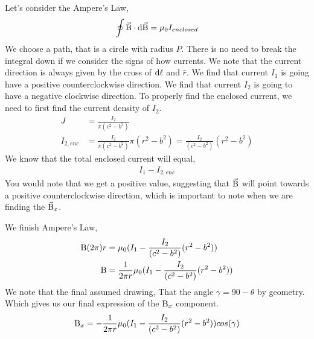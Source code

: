 \vspace{10pt}
Let's consider the Ampere's Law,
\begin{equation*}
	\oint \vec{\mathrm{B}} \cdot \mathrm{d}\vec{\mathrm{\mathrm{B}}} = \mu_0I_{enclosed}
\end{equation*}
We choose a path, that is a circle with radius $P$. There is no need to break the integral down if we consider the signs of how currents. We note that the current direction is always given by the cross of $\mathrm{d\ell}$ and $\hat{r}$. We find that current $I_1$ is going have a positive counterclockwise direction. We find that current $I_2$ is going to have a negative clockwise direction. To properly find the enclosed current, we need to first find the current density of $I_2$.
\begin{align*}
	J &= \frac{I_2}{\pi(c^2-b^2)} \\ 
	I_{2,enc} &= \frac{I_2}{\pi(c^2-b^2)} \pi (r^2-b^2) = \frac{I_2}{(c^2-b^2)}(r^2-b^2)
\end{align*}
We know that the total enclosed current will equal, 
\begin{align*}
	I_1 - I_{2,enc} 
\end{align*}
You would note that we get a positive value, suggesting that $\vec{\mathrm{B}}$ will point towards a positive counterclockwise direction, which is important to note when we are finding the $\vec{\mathrm{B}}_x$.

We finish Ampere's Law, 
\begin{align*}
	\mathrm{B}(2\pi)r &= \mu_0(I_1 - \frac{I_2}{(c^2-b^2)}(r^2-b^2)) \\ 
	\mathrm{B} &= \frac{1}{2\pi r}\mu_0(I_1 - \frac{I_2}{(c^2-b^2)}(r^2-b^2))
\end{align*}
We note that the final assumed drawing, 
That the angle $\gamma = 90 - \theta$ by geometry. Which gives us our final expression of the $\mathrm{B}_x$ component. 
\begin{equation*}
	\mathrm{B}_x = -\frac{1}{2\pi r}\mu_0(I_1 - \frac{I_2}{(c^2-b^2)}(r^2-b^2))cos(\gamma)
\end{equation*}